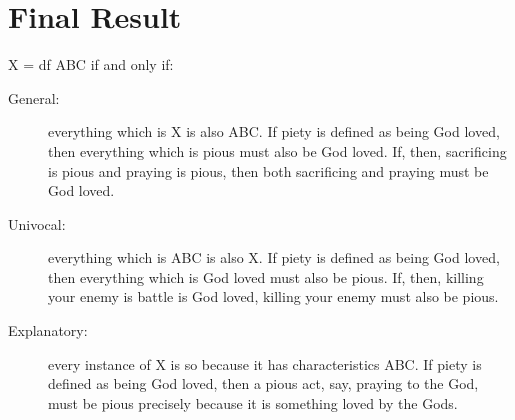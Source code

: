\documentclass[10 pt]{article}
\begin{document}





\section*{Final Result}
 X = df ABC if and only if: 
\begin{description}
\item[General:] everything which is X is also ABC. If piety is defined as being God loved, then everything which is pious must also be God loved. If, then, sacrificing is pious and praying is pious, then both sacrificing and praying must be God loved. 
\item[Univocal:] everything which is ABC is also X. If piety is defined as being God loved, then everything which is God loved must also be pious. If, then, killing your enemy is battle is God loved, killing your enemy must also be pious. 
\item[Explanatory:]  every instance of X is so because it has characteristics ABC. If piety is defined as being God loved, then a pious act, say, praying to the God, must be pious precisely because it is something loved by the Gods. 
\end{description}
\end{document}
